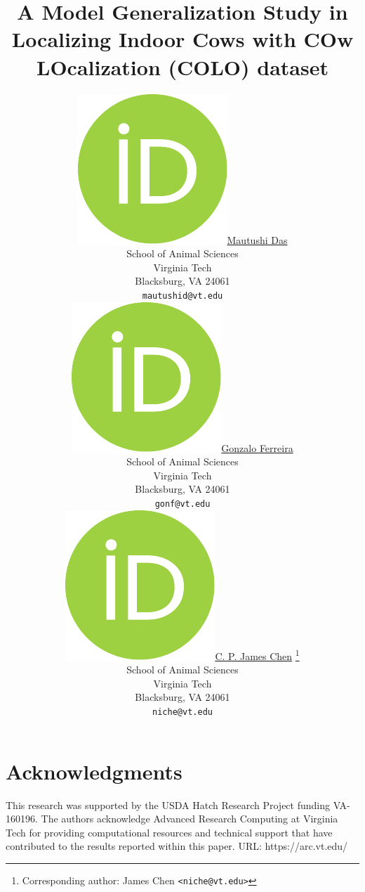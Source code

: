 \documentclass{article}
\title{A Model Generalization Study in Localizing Indoor Cows with COw LOcalization (COLO) dataset}
\author{
    \href{https://orcid.org/0000-0000-0000-0000}{\includegraphics[scale=0.06]{orcid.pdf}\hspace{1mm}Mautushi Das} \\
	School of Animal Sciences\\
	Virginia Tech\\
	Blacksburg, VA 24061 \\
	\texttt{mautushid@vt.edu} \\
	\And
	\href{https://orcid.org/0000-0000-0000-0000}{\includegraphics[scale=0.06]{orcid.pdf}\hspace{1mm}Gonzalo Ferreira} \\
	School of Animal Sciences\\
	Virginia Tech\\
	Blacksburg, VA 24061 \\
	\texttt{gonf@vt.edu} \\
	\And
	\href{https://orcid.org/0000-0002-2018-0702}{\includegraphics[scale=0.06]{orcid.pdf}\hspace{1mm}C. P. James Chen} \thanks{Corresponding author: James Chen \texttt{<niche@vt.edu>}}\\
	School of Animal Sciences\\
	Virginia Tech\\
	Blacksburg, VA 24061 \\
	\texttt{niche@vt.edu}
}
\begin{document}
\maketitle


\newpage




\section*{Acknowledgments}

This research was supported by the USDA Hatch Research Project funding VA-160196. The authors acknowledge Advanced Research Computing at Virginia Tech for providing computational resources and technical support that have contributed to the results reported within this paper. URL: https://arc.vt.edu/

\newpage




\newpage


\end{document}
